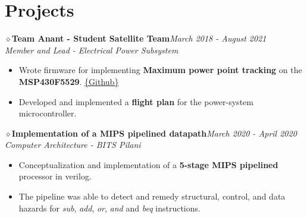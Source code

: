 \documentclass[letterpaper,11pt]{article}
\makeatletter
\newcommand{\resumeItem}[1]{
  \item\small{
    {#1 \vspace{-2pt}}
  }
}
\newcommand{\resumeSubheading}[4]{
  \vspace{-2pt}\item
    \begin{tabular*}{1.0\textwidth}[t]{l@{\extracolsep{\fill}}r}
      \textbf{#1} & \textbf{\small #2} \\
      \textit{\small#3} & \textit{\small #4} \\
    \end{tabular*}\vspace{-7pt}
}
\newcommand{\resumeSubHeadingListStart}{\begin{itemize}[leftmargin=0.0in, label={}]}
\newcommand{\resumeSubHeadingListEnd}{\end{itemize}}
\newcommand{\resumeItemListStart}{\begin{itemize}}
\newcommand{\resumeItemListEnd}{\end{itemize}\vspace{-5pt}}
\newcommand{\project}[3]{\texorpdfstring{$\diamond$}{}\hspace{4pt}\textbf{#1}\texorpdfstring{\hfill}{}\emph{#2}\texorpdfstring{\\}{}\hspace*{8pt}\emph{#3}}
\makeatother
\begin{document}
\section{Projects}
    \project{Team Anant - Student Satellite Team}{March 2018 - August 2021}{Member and Lead - Electrical Power Subsystem}
        \begin{itemize}\setlength{\itemsep}{0pt}\setlength{\parskip}{0pt}\vspace{-0.2cm}
            \item Wrote firmware for implementing \textbf{Maximum power point tracking} on the \textbf{MSP430F5529}. {\href{https://github.com/parthkharade/MSP430F5529}{\{Github\}}}
            \item Developed and implemented a \textbf{flight plan} for the power-system microcontroller.
        \end{itemize}
    \project{Implementation of a MIPS pipelined datapath}{March 2020 - April 2020}{Computer Architecture - BITS Pilani}
        \begin{itemize}\setlength{\itemsep}{0pt}\setlength{\parskip}{0pt}\vspace{-0.2cm}
            \item Conceptualization and implementation of a \textbf{5-stage MIPS pipelined} processor in verilog.
            \item The pipeline was able to detect and remedy structural, control, and data hazards for \emph{sub}, \emph{add}, \emph{or}, \emph{and} and \emph{beq} instructions.
        \end{itemize}
    \vspace{-0.2cm}
    \vspace{-15pt}


%



        
\end{document}
